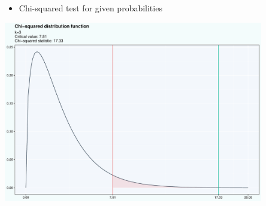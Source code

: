 \documentclass[
  ignorenonframetext,
]{beamer}
\providecommand{\tightlist}{%
  \setlength{\itemsep}{0pt}\setlength{\parskip}{0pt}}\usepackage{longtable,booktabs,array}
\begin{document}
\begin{frame}{}
\label{section-5}
\begin{itemize}
\tightlist
\item
  Chi-squared test for given probabilities
\end{itemize}

\begin{center}
\includegraphics[width=0.85\textwidth,height=\textheight]{006_comparing_groups_statistical_tests_files/figure-beamer/unnamed-chunk-6-1.pdf}
\end{center}
\end{frame}
\end{document}
